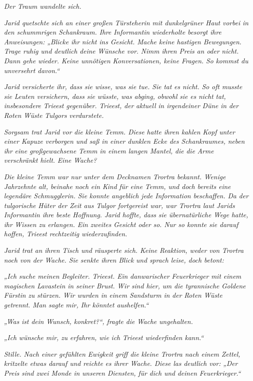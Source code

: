 \textit{Der Traum wandelte sich.}\bigskip





\textit{Jarid quetschte sich an einer großen Türsteherin mit dunkelgrüner Haut vorbei in den schummrigen Schankraum. Ihre Informantin wiederholte besorgt ihre Anweisungen: „Blicke ihr nicht ins Gesicht. Mache keine hastigen Bewegungen. Trage ruhig und deutlich deine Wünsche vor. Nimm ihren Preis an oder nicht. Dann gehe wieder. Keine unnötigen Konversationen, keine Fragen. So kommst du unversehrt davon.“}

\textit{Jarid versicherte ihr, dass sie wisse, was sie tue. Sie tat es nicht. So oft musste sie Leuten versichern, dass sie wüsste, was abging, obwohl sie es nicht tat, insbesondere Trieest gegenüber. Trieest, der aktuell in irgendeiner Düne in der Roten Wüste Tulgors verdurstete.}

\textit{Sorgsam trat Jarid vor die kleine Temm. Diese hatte ihren kahlen Kopf unter einer Kapuze verborgen und saß in einer dunklen Ecke des Schankraumes, neben ihr eine großgewachsene Temm in einem langen Mantel, die die Arme verschränkt hielt. Eine Wache?}

\textit{Die kleine Temm war nur unter dem Decknamen Trortra bekannt. Wenige Jahrzehnte alt, beinahe noch ein Kind für eine Temm, und doch bereits eine legendäre Schmugglerin. Sie konnte angeblich jede Information beschaffen. Da der tulgorische Hüter der Zeit aus Tulgor fortgereist war, war Trortra laut Jarids Informantin ihre beste Hoffnung. Jarid hoffte, dass sie übernatürliche Wege hatte, ihr Wissen zu erlangen. Ein zweites Gesicht oder so. Nur so konnte sie darauf hoffen, Trieest rechtzeitig wiederzufinden.}

\textit{Jarid trat an ihren Tisch und räusperte sich. Keine Reaktion, weder von Trortra noch von der Wache. Sie senkte ihren Blick und sprach leise, doch betont:}

\textit{„Ich suche meinen Begleiter. Trieest. Ein danwarischer Feuerkrieger mit einem magischen Lavastein in seiner Brust. Wir sind hier, um die tyrannische Goldene Fürstin zu stürzen. Wir wurden in einem Sandsturm in der Roten Wüste getrennt. Man sagte mir, Ihr könntet aushelfen.“}

\textit{„Was ist dein Wunsch, konkret?“, fragte die Wache ungehalten.}

\textit{„Ich wünsche mir, zu erfahren, wie ich Trieest wiederfinden kann.“}

\textit{Stille. Nach einer gefühlten Ewigkeit griff die kleine Trortra nach einem Zettel, kritzelte etwas darauf und reichte es ihrer Wache. Diese las deutlich vor: „Der Preis sind zwei Monde in unseren Diensten, für dich und deinen Feuerkrieger.“}

